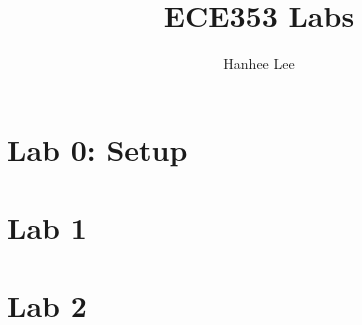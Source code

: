 \documentclass[twoside]{article}
\title{ECE353 Labs}
\author{Hanhee Lee}
\begin{document}
\maketitle

\tableofcontents

\begin{definition}
    
\end{definition}

\begin{process}

\end{process}

\begin{motivation}

\end{motivation}

\begin{derivation}

\end{derivation}

\begin{warning}

\end{warning}

\begin{summary}

\end{summary}

\begin{algo}

\end{algo}

\begin{example}
    
\end{example}

\begin{faq}

\end{faq}
\cleardoublepage

\section{Lab 0: Setup}

\cleardoublepage

\section{Lab 1}
\cleardoublepage

\section{Lab 2} 
\cleardoublepage
\end{document}
